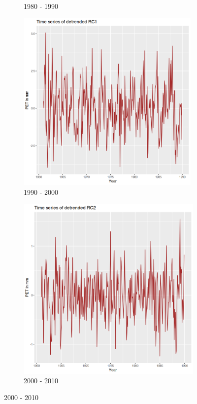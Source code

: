 \documentclass[12pt,a4paper]{article}
\begin{document}
\begin{figure}[t!ph]
\begin{subfigure}[b]{0.3\textwidth}
                \caption{1980 - 1990}
                 \label{fig2:frowningcat}
         \end{subfigure}


     \begin{subfigure}[b]{0.3\textwidth}
             \centering
             \includegraphics[width=0.985\textwidth]{./gaphics/q002_g.png}
            \caption{1990 - 2000}
             \label{fig2:scared}
     \end{subfigure}
     \begin{subfigure}[b]{0.3\textwidth}
             \centering
             \includegraphics[width=\textwidth]{./gaphics/q002_h.png}
            \caption{2000  - 2010}
             \label{fig2:tired}
      \end{subfigure}


\end{figure}
\end{document}
